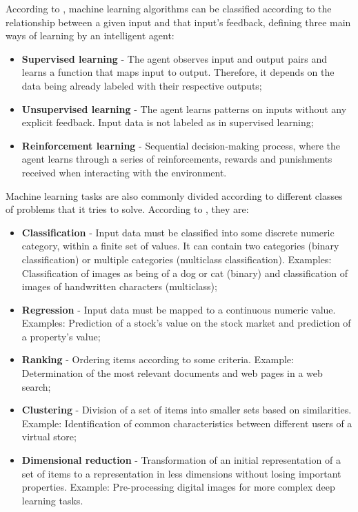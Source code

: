 \documentclass[a4paper,fleqn]{cas-sc}
\begin{document}
According to , machine learning algorithms can be classified according to the relationship between a given input and that input's feedback, defining three main ways of learning by an intelligent agent:

\begin{itemize}
    \item \textbf{Supervised learning} - The agent observes input and output pairs and learns a function that maps input to output. Therefore, it depends on the data being already labeled with their respective outputs;
    \item \textbf{Unsupervised learning} - The agent learns patterns on inputs without any explicit feedback. Input data is not labeled as in supervised learning;
    \item \textbf{Reinforcement learning} - Sequential decision-making process, where the agent learns through a series of reinforcements, rewards and punishments received when interacting with the environment.
\end{itemize}

Machine learning tasks are also commonly divided according to different classes of problems that it tries to solve. According to , they are:
\begin{itemize}
     \item \textbf{Classification} - Input data must be classified into some discrete numeric category, within a finite set of values. It can contain two categories (binary classification) or multiple categories (multiclass classification). Examples: Classification of images as being of a dog or cat (binary) and classification of images of handwritten characters (multiclass);
    \item \textbf{Regression} - Input data must be mapped to a continuous numeric value. Examples: Prediction of a stock's value on the stock market and prediction of a property's value;
    \item \textbf{Ranking} - Ordering items according to some criteria. Example: Determination of the most relevant documents and web pages in a web search;
    \item \textbf{Clustering} - Division of a set of items into smaller sets based on similarities. Example: Identification of common characteristics between different users of a virtual store;
    \item \textbf{Dimensional reduction} - Transformation of an initial representation of a set of items to a representation in less dimensions without losing important properties. Example: Pre-processing digital images for more complex deep learning tasks.
\end{itemize}
\end{document}
